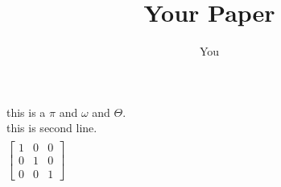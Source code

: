 \documentclass{article}
\title{Your Paper}
\author{You}
\begin{document}
\maketitle

this is a $\pi$ and $\omega$ and $\Theta$.\\
this is second line.
\begin{equation}
\begin{split}

\end{split}
\end{equation}
$\begin{bmatrix}
            1&0&0\\
            0&1&0\\
            0&0&1
            \end{bmatrix}$
\end{document}
